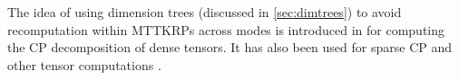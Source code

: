 The idea of using dimension trees (discussed in \cref{sec:dimtrees}) to avoid recomputation within MTTKRPs across modes is introduced in \cite{PTC13a} for computing the CP decomposition of dense tensors.
It has also been used for sparse CP \cite{LCPSV17,KU18} and other tensor computations \cite{KU16}.

%
%

